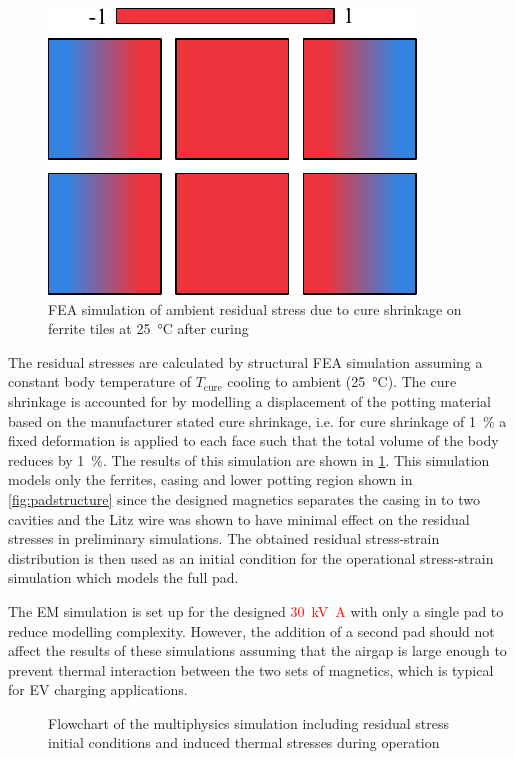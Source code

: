\documentclass[conference]{IEEEtran}
\begin{document}
\begin{figure}[t]
  \centering
  \includegraphics{figures/simulatedpottingpadstresses.pdf}
  \caption{FEA simulation of ambient residual stress due to cure shrinkage on ferrite tiles at \SI{25}{\celsius} after curing}
  \label{fig:pottingstresses}
\end{figure}

The residual stresses are calculated by structural FEA simulation assuming a constant body temperature of $T_\text{cure}$ cooling to ambient (\SI{25}{\celsius}). 
The cure shrinkage is accounted for by modelling a displacement of the potting material based on the manufacturer stated cure shrinkage, i.e. for cure shrinkage of \SI{1}{\percent} a fixed deformation is applied to each face such that the total volume of the body reduces by \SI{1}{\percent}.
The results of this simulation are shown in \cref{fig:pottingstresses}. 
This simulation models only the ferrites, casing and lower potting region shown in \cref{fig:padstructure} since the designed magnetics separates the casing in to two cavities and the Litz wire was shown to have minimal effect on the residual stresses in preliminary simulations. 
The obtained residual stress-strain distribution is then used as an initial condition for the operational stress-strain simulation which models the full pad. 

The EM simulation is set up for the designed \textcolor{red}{\SI{30}{\kilo\volt\ampere}} with only a single pad to reduce modelling complexity. 
However, the addition of a second pad should not affect the results of these simulations assuming that the airgap is large enough to prevent thermal interaction between the two sets of magnetics, which is typical for EV charging applications.


\begin{figure}
  
  \caption{Flowchart of the multiphysics simulation including residual stress initial conditions and induced thermal stresses during operation}
  \label{fig:simulationflowchart}
\end{figure}
\end{document}

